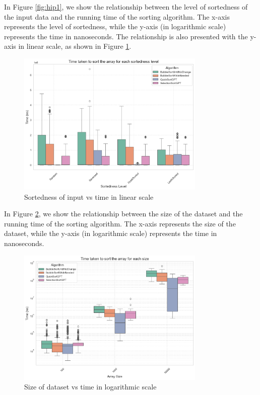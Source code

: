\documentclass[unicode,11pt,a4paper,oneside,numbers=endperiod,openany]{scrartcl}
\begin{document}
    In Figure \ref{fig:hip1}, we show the relationship between the level of sortedness of the input data and the running time of the sorting algorithm. The x-axis represents the level of sortedness, while the y-axis (in logarithmic scale) represents the time in nanoseconds. The relationship is also presented with the y-axis in linear scale, as shown in Figure \ref{fig:hip1_linear}.\\
    \hfill

    \begin{figure}[htbp]
        \centering
        \includegraphics[width=0.8\textwidth]{./fig/hip1-nonLog.png}
        \caption{Sortedness of input vs time in linear scale}
        \label{fig:hip1_linear}
    \end{figure}

    In Figure \ref{fig:hip2}, we show the relationship between the size of the dataset and the running time of the sorting algorithm. The x-axis represents the size of the dataset, while the y-axis (in logarithmic scale) represents the time in nanoseconds. \\ 
\hfill



\begin{figure}[htbp]
    \centering
    \includegraphics[width=0.8\textwidth]{./fig/hip2.png}
    \caption{Size of dataset vs time in logarithmic scale}
    \label{fig:hip2}
\end{figure}
\end{document}
